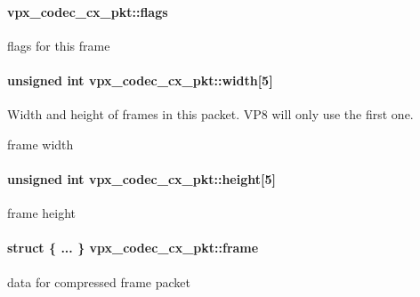 \paragraph[{\texorpdfstring{flags}{flags}}]{ vpx\+\_\+codec\+\_\+cx\+\_\+pkt\+::flags}\hypertarget{structvpx__codec__cx__pkt_a3876fe0306342611465e9c15c6c4ae2f}{}\label{structvpx__codec__cx__pkt_a3876fe0306342611465e9c15c6c4ae2f}
flags for this frame 
\paragraph[{\texorpdfstring{width}{width}}]{\setlength{\rightskip}{0pt plus 5cm}unsigned int vpx\+\_\+codec\+\_\+cx\+\_\+pkt\+::width\mbox{[}5\mbox{]}}\hypertarget{structvpx__codec__cx__pkt_a6f30c2d1c2c32a319ead6e9cb4e81665}{}\label{structvpx__codec__cx__pkt_a6f30c2d1c2c32a319ead6e9cb4e81665}


Width and height of frames in this packet. V\+P8 will only use the first one. 

frame width 
\paragraph[{\texorpdfstring{height}{height}}]{\setlength{\rightskip}{0pt plus 5cm}unsigned int vpx\+\_\+codec\+\_\+cx\+\_\+pkt\+::height\mbox{[}5\mbox{]}}\hypertarget{structvpx__codec__cx__pkt_aadd847e4464f758b7cd73179245f0028}{}\label{structvpx__codec__cx__pkt_aadd847e4464f758b7cd73179245f0028}
frame height 
\paragraph[{\texorpdfstring{frame}{frame}}]{\setlength{\rightskip}{0pt plus 5cm}struct \{ ... \}   vpx\+\_\+codec\+\_\+cx\+\_\+pkt\+::frame}\hypertarget{structvpx__codec__cx__pkt_a81e33bf4408a3983abb16492fee359ff}{}\label{structvpx__codec__cx__pkt_a81e33bf4408a3983abb16492fee359ff}
data for compressed frame packet 

